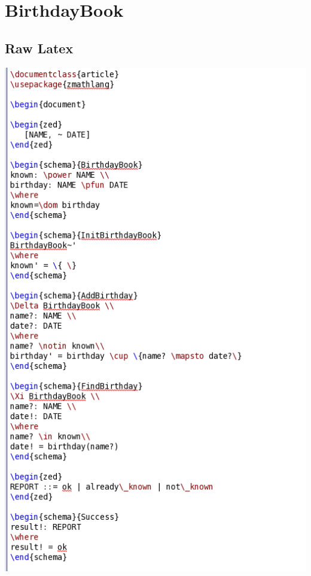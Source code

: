 \section{BirthdayBook}
\label{app:bb}

\subsection{Raw Latex}
\label{app:bb0}
\includegraphics[scale=0.5]{examples/bb/0imagea.png}

